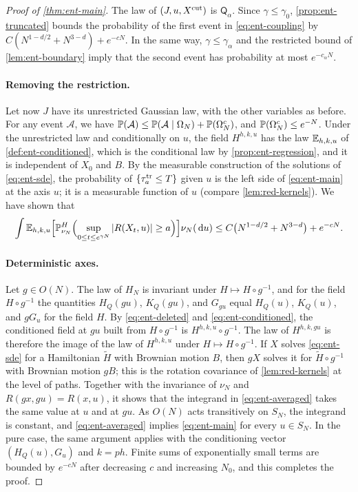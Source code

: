 \begin{proof}[Proof of \cref{thm:ent-main}]
The law of $(J,u,X^{\rm cut})$ is $\mathsf Q_\alpha$. Since $\gamma\le
\gamma_0$, \cref{prop:ent-truncated} bounds the probability of the first
event in \eqref{eq:ent-coupling} by $C(N^{1-d/2}+N^{3-d})+e^{-cN}$. In the
same way, $\gamma\le\gamma_\alpha$ and the restricted bound of
\cref{lem:ent-boundary} imply that the second event has probability at most
$e^{-c_\alpha N}$.

\paragraph{Removing the restriction.}
Let now $J$ have its unrestricted Gaussian law, with the other variables as
before. For any event $\mathcal A$, we have
$\mathbb P(\mathcal A)\le\mathbb P(\mathcal A\mid\Omega_N)+\mathbb P(\Omega_N^c)$, and
$\mathbb P(\Omega_N^c)\le e^{-N}$. Under the unrestricted law and conditionally
on $u$, the field $H^{h,k,u}$ has the law $\mathbb E_{h,k,u}$ of
\cref{def:ent-conditioned}, which is the conditional law by
\cref{prop:ent-regression}, and it is independent of $X_0$ and $B$. By the measurable
construction of the solutions of \eqref{eq:ent-sde}, the probability of
$\{\tau_a^{\rm tr}\le T\}$ given $u$ is the left side of \eqref{eq:ent-main}
at the axis $u$; it is a measurable function of $u$ (compare
\cref{lem:red-kernels}). We have shown that
\begin{equation}\label{eq:ent-averaged}
 \int\mathbb E_{h,k,u}\Bigl[\mathbb P^H_{\nu_N}\Bigl(\sup_{0\le t\le e^{\gamma N}}
 |R(X_t,u)|\ge a\Bigr)\Bigr]\nu_N(\,\mathrm d u)
 \le C\bigl(N^{1-d/2}+N^{3-d}\bigr)+e^{-cN}.
\end{equation}

\paragraph{Deterministic axes.}
Let $g\in O(N)$. The law of $H_N$ is invariant under $H\mapsto H\circ
g^{-1}$, and for the field $H\circ g^{-1}$ the quantities $H_Q(gu)$,
$K_Q(gu)$, and $G_{gu}$ equal $H_Q(u)$, $K_Q(u)$, and $gG_u$ for the field
$H$. By \eqref{eq:ent-deleted} and \eqref{eq:ent-conditioned}, the
conditioned field at $gu$ built from $H\circ g^{-1}$ is $H^{h,k,u}\circ
g^{-1}$. The law of $H^{h,k,gu}$ is therefore the image of the law of
$H^{h,k,u}$ under $H\mapsto H\circ g^{-1}$. If $X$ solves \eqref{eq:ent-sde} for a
Hamiltonian $\widetilde H$ with Brownian motion $B$, then $gX$ solves it for
$\widetilde H\circ g^{-1}$ with Brownian motion $gB$; this is the rotation
covariance of \cref{lem:red-kernels} at the level of paths. Together with
the invariance of $\nu_N$ and $R(gx,gu)=R(x,u)$, it shows that the
integrand in \eqref{eq:ent-averaged} takes the same value at $u$ and at
$gu$. As $O(N)$ acts transitively on $S_N$, the
integrand is constant, and \eqref{eq:ent-averaged} implies
\eqref{eq:ent-main} for every $u\in S_N$. In the pure case, the same argument applies with the
conditioning vector $(H_Q(u),G_u)$ and $k=ph$. Finite sums of exponentially small
terms are bounded by $e^{-cN}$ after decreasing $c$ and increasing $N_0$,
and this completes the proof.
\end{proof}
